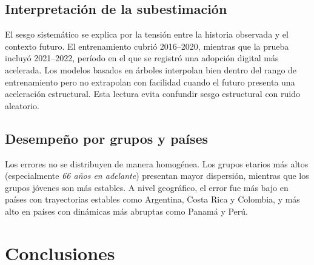 \documentclass[12pt,a4paper]{article}
\begin{document}
\subsection{Interpretaci\'on de la subestimaci\'on}

El sesgo sistem\'atico se explica por la tensi\'on entre la historia observada y el contexto futuro. El entrenamiento cubri\'o 2016--2020, mientras que la prueba incluy\'o 2021--2022, per\'iodo en el que se registr\'o una adopci\'on digital m\'as acelerada. Los modelos basados en \'arboles interpolan bien dentro del rango de entrenamiento pero no extrapolan con facilidad cuando el futuro presenta una aceleraci\'on estructural. Esta lectura evita confundir sesgo estructural con ruido aleatorio.

\subsection{Desempe\~no por grupos y pa\'ises}

Los errores no se distribuyen de manera homog\'enea. Los grupos etarios m\'as altos (especialmente \emph{66 a\~nos en adelante}) presentan mayor dispersi\'on, mientras que los grupos j\'ovenes son m\'as estables. A nivel geogr\'afico, el error fue m\'as bajo en pa\'ises con trayectorias estables como Argentina, Costa Rica y Colombia, y m\'as alto en pa\'ises con din\'amicas m\'as abruptas como Panam\'a y Per\'u.

\section{Conclusiones}
\end{document}
